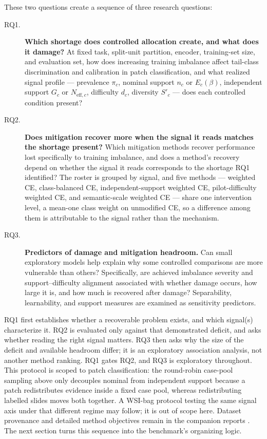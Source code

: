 \documentclass[11pt]{article}
\begin{document}
These two questions create a sequence of three research questions:
\begin{description}
  \item[RQ1.] \textbf{Which shortage does controlled allocation create, and what does it damage?} At fixed task, split-unit partition, encoder, training-set size, and evaluation set, how does increasing training imbalance affect tail-class discrimination and calibration in patch classification, and what realized signal profile --- prevalence $\pi_c$, nominal support $n_c$ or $E_c(\beta)$, independent support $G_c$ or $N_{\mathrm{eff},c}$, difficulty $d_c$, diversity $S'_c$ --- does each controlled condition present?
  \item[RQ2.] \textbf{Does mitigation recover more when the signal it reads matches the shortage present?} Which mitigation methods recover performance lost specifically to training imbalance, and does a method's recovery depend on whether the signal it reads corresponds to the shortage RQ1 identified? The roster is grouped by signal, and five methods --- weighted CE, class-balanced CE, independent-support weighted CE, pilot-difficulty weighted CE, and semantic-scale weighted CE --- share one intervention level, a mean-one class weight on unmodified CE, so a difference among them is attributable to the signal rather than the mechanism.
  \item[RQ3.] \textbf{Predictors of damage and mitigation headroom.} Can small exploratory models help explain why some controlled comparisons are more vulnerable than others? Specifically, are achieved imbalance severity and support--difficulty alignment associated with whether damage occurs, how large it is, and how much is recovered after damage? Separability, learnability, and support measures are examined as sensitivity predictors.
\end{description}
RQ1 first establishes whether a recoverable problem exists, and which signal(s) characterize it. RQ2 is evaluated only against that demonstrated deficit, and asks whether reading the right signal matters. RQ3 then asks why the size of the deficit and available headroom differ; it is an exploratory association analysis, not another method ranking. RQ1 gates RQ2, and RQ3 is exploratory throughout. This protocol is scoped to patch classification: the round-robin case-pool sampling above only decouples nominal from independent support because a patch redistributes evidence inside a fixed case pool, whereas redistributing labelled slides moves both together. A WSI-bag protocol testing the same signal axis under that different regime may follow; it is out of scope here. Dataset provenance and detailed method objectives remain in the companion reports \citep{queisler2026datasets,queisler2026imbalanceMethods}. The next section turns this sequence into the benchmark's organizing logic.
\end{document}
